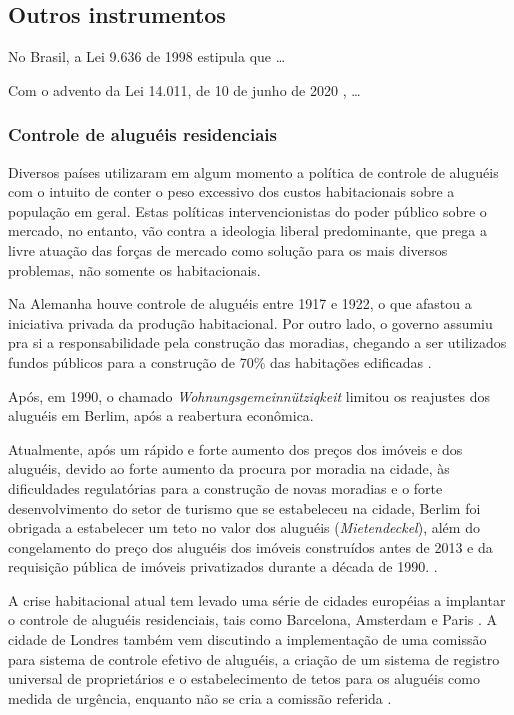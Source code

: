 \documentclass[
	12pt,				%
	oneside,			%
	a4paper,			%
	chapter=TITLE,		%
	section=TITLE,		%
	english,			%
	brazil				%
	]{abntex2}
\begin{document}
\begin{refsection}
\hypertarget{outros-instrumentos}{%
\subsection{Outros instrumentos}\label{outros-instrumentos}}

No Brasil, a Lei 9.636 de 1998 \autocite{lei9636} estipula que \ldots{}

Com o advento da Lei 14.011, de 10 de junho de 2020 \autocite{lei14011}, \ldots{}

\hypertarget{controle-de-aluguuxe9is-residenciais}{%
\subsubsection{Controle de aluguéis residenciais}\label{controle-de-aluguuxe9is-residenciais}}

Diversos países utilizaram em algum momento a política de controle de aluguéis
com o intuito de conter o peso excessivo dos custos habitacionais sobre a
população em geral. Estas políticas intervencionistas do poder público sobre o
mercado, no entanto, vão contra a ideologia liberal predominante, que prega a
livre atuação das forças de mercado como solução para os mais diversos problemas,
não somente os habitacionais.

Na Alemanha houve controle de aluguéis entre 1917 e 1922, o que afastou a
iniciativa privada da produção habitacional. Por outro lado, o governo assumiu
pra si a responsabilidade pela construção das moradias, chegando a ser
utilizados fundos públicos para a construção de 70\% das habitações edificadas
\autocite[89]{poleto}.

Após, em 1990, o chamado \emph{Wohnungsgemeinnütziqkeit} limitou os reajustes dos
aluguéis em Berlim, após a reabertura econômica.

Atualmente, após um rápido e forte aumento dos preços dos imóveis e dos
aluguéis, devido ao forte aumento da procura por moradia na cidade, às
dificuldades regulatórias para a construção de novas moradias e o forte
desenvolvimento do setor de turismo que se estabeleceu na cidade, Berlim foi
obrigada a estabelecer um teto no valor dos aluguéis (\emph{Mietendeckel}), além do
congelamento do preço dos aluguéis dos imóveis construídos antes de 2013 e da
requisição pública de imóveis privatizados durante a década de 1990. \autocite{berlim}.

A crise habitacional atual tem levado uma série de cidades européias a implantar
o controle de aluguéis residenciais, tais como Barcelona, Amsterdam e Paris
\autocite{economist-rent-control}. A cidade de Londres também vem discutindo a
implementação de uma comissão para sistema de controle efetivo de aluguéis, a
criação de um sistema de registro universal de proprietários e o estabelecimento
de tetos para os aluguéis como medida de urgência, enquanto não se cria a
comissão referida \autocite{guardian}.


\end{refsection}
\end{document}
